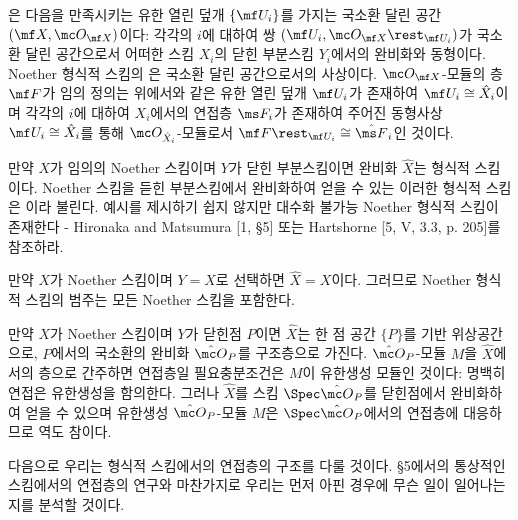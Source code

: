 	
	\begin{definition}
	은 다음을 만족시키는 유한 열린 덮개 $\{\mf U_i\}$를 가지는
	국소환 달린 공간 $(\mf X,\mc O_{\mf X})$이다: 각각의 $i$에 대하여 쌍 $(\mf U_i,\mc O_{\mf X}\rest_{\mf U_i})$가
	국소환 달린 공간으로서 어떠한 스킴 $X_i$의 닫힌 부분스킴 $Y_i$에서의 완비화와 동형이다.
	Noether 형식적 스킴의 은 국소환 달린 공간으로서의 사상이다.
	$\mc O_{\mf X}$-모듈의 층 $\mf F$가 임의 정의는
	위에서와 같은 유한 열린 덮개 $\mf U_i$가 존재하여 $\mf U_i\cong\hat X_i$이며
	각각의 $i$에 대하여 $X_i$에서의 연접층 $\ms F_i$가 존재하여
	주어진 동형사상 $\mf U_i\cong\hat X_i$를 통해 $\mc O_{\hat X_i}$-모듈로서 $\mf F\rest_{\mf U_i}\cong\hat{\ms F}_i$인 것이다.
	\end{definition}
	
	
	\begin{example}
	만약 $X$가 임의의 Noether 스킴이며 $Y$가 닫힌 부분스킴이면 완비화 $\hat X$는 형식적 스킴이다.
	 Noether 스킴을 듣힌 부분스킴에서 완비화하여 얻을 수 있는 이러한 형식적 스킴은 이라 불린다.
	예시를 제시하기 쉽지 않지만 대수화 불가능 Noether 형식적 스킴이 존재한다 -
	Hironaka and Matsumura [1, \S 5] 또는 Hartshorne [5, V, 3.3, p. 205]를 참조하라.
	\end{example}
	
	
	\begin{example}
	만약 $X$가 Noether 스킴이며 $Y=X$로 선택하면 $\hat X=X$이다. 그러므로 Noether 형식적 스킴의 범주는 모든 Noether 스킴을 포함한다.
	\end{example}
	
	
	\begin{example}
	만약 $X$가 Noether 스킴이며 $Y$가 닫힌점 $P$이면 $\hat X$는 한 점 공간 $\{P\}$를 기반 위상공간으로,
	$P$에서의 국소환의 완비화 $\hat{\mc O}_P$를 구조층으로 가진다.
	$\hat{\mc O}_P$-모듈 $M$을 $\hat X$에서의 층으로 간주하면 연접층일 필요충분조건은 $M$이 유한생성 모듈인 것이다:
	명백히 연접은 유한생성을 함의한다. 그러나 $\hat X$를 스킴 $\Spec\hat{\mc O}_P$를 닫힌점에서 완비화하여 얻을 수 있으며
	유한생성 $\hat{\mc O}_P$-모듈 $M$은 $\Spec\hat{\mc O}_P$에서의 연접층에 대응하므로 역도 참이다.
	\end{example}
	
	다음으로 우리는 형식적 스킴에서의 연접층의 구조를 다룰 것이다.
	\S 5에서의 통상적인 스킴에서의 연접층의 연구와 마찬가지로 우리는 먼저 아핀 경우에 무슨 일이 일어나는지를 분석할 것이다.
	
